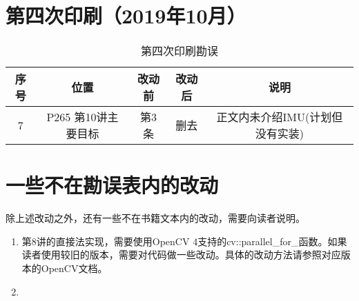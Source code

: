 \documentclass[lang=cn,11pt,numbers]{errata}
\begin{document}
\section{第四次印刷（2019年10月）}
\begin{table}[!htp]
	\centering
	\caption{第四次印刷勘误}
	\begin{tabular}{c|cccc}
		\hline\hline
		序号 & 位置 & 改动前 & 改动后 & 说明 \\\hline
		7 & P265 第10讲主要目标 & 第3条 & 删去 & 正文内未介绍IMU(计划但没有实装) \\
		\hline \hline
	\end{tabular}
\end{table}

\section{一些不在勘误表内的改动}
除上述改动之外，还有一些不在书籍文本内的改动，需要向读者说明。

\begin{enumerate}
	\item 第8讲的直接法实现，需要使用OpenCV 4支持的cv::parallel\_for\_函数。如果读者使用较旧的版本，需要对代码做一些改动。具体的改动方法请参照对应版本的OpenCV文档。
	\item 
\end{enumerate}
\end{document}

